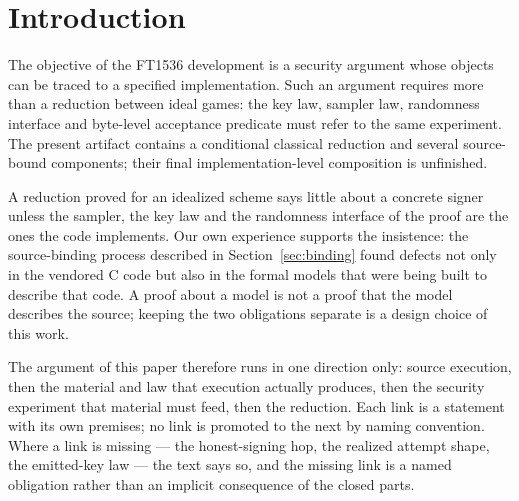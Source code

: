 \section{Introduction}\label{sec:intro}
The objective of the FT1536 development is a security argument whose
objects can be traced to a specified implementation. Such an argument
requires more than a reduction between ideal games: the key law,
sampler law, randomness interface and byte-level acceptance predicate
must refer to the same experiment. The present artifact contains a
conditional classical reduction and several source-bound components;
their final implementation-level composition is unfinished.

A reduction proved for an idealized scheme says little about a concrete
signer unless the sampler, the key law and the randomness interface of
the proof are the ones the code implements. Our own experience supports
the insistence: the source-binding process described in
Section~\ref{sec:binding} found defects not only in the vendored C code
but also in the formal models that were being built to describe that
code. A proof about a model is not a proof that the model describes the
source; keeping the two obligations separate is a design choice of this
work.

The argument of this paper therefore runs in one direction only:
source execution, then the material and law that execution actually
produces, then the security experiment that material must feed, then
the reduction. Each link is a statement with its own premises; no link
is promoted to the next by naming convention. Where a link is missing
--- the honest-signing hop, the realized attempt shape, the emitted-key
law --- the text says so, and the missing link is a named obligation
rather than an implicit consequence of the closed parts.

